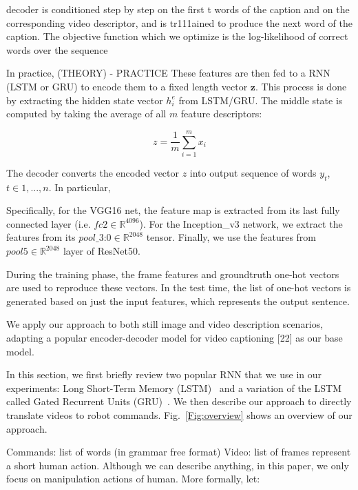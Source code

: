 { 
 decoder is conditioned step by step on the first t words of the caption and on the corresponding video descriptor, and is tr111ained to produce the next word of the caption. The objective function which we optimize is the log-likelihood of correct words over the sequence


In practice, (THEORY) - PRACTICE These features are then fed to a RNN (LSTM or GRU) to encode them to a fixed length vector $\mathbf{z}$. This process is done by extracting the hidden state vector $h_i^e$ from LSTM/GRU. The middle state is computed by taking the average of all $m$ feature descriptors:

\begin{equation}
z = \frac{1}{m}\sum\limits_{i = 1}^m {{x_i}}
\end{equation}

The decoder converts the encoded vector $z$ into output sequence of words $y_t$, $t \in {1, . . . ,n}$. In particular,


Specifically, for the VGG16 net, the feature map is extracted from its last fully connected layer (i.e. $\textit{fc2} \in {\mathbb{R}^{4096}}$). For the Inception\_v3 network, we extract the features from its $\textit{pool\_3:0} \in {\mathbb{R}^{2048}}$ tensor. Finally, we use the features from $\textit{pool5} \in {\mathbb{R}^{2048}}$ layer of ResNet50.

During the training phase, the frame features and  groundtruth one-hot vectors are used to reproduce these vectors. In the test time, the list of one-hot vectors is generated based on just the input features, which represents the output sentence.


We apply our approach to both still image and video description scenarios, adapting a popular encoder-decoder model for video captioning [22] as our base model.



In this section, we first briefly review two popular RNN that we use in our experiments: Long Short-Term Memory (LSTM)~\cite{Hochreiter97_LSTM} and a variation of the LSTM called Gated Recurrent Units (GRU)~\cite{Cho14_GRU}. We then describe our approach to directly translate videos to robot commands. Fig.~\ref{Fig:overview} shows an overview of our approach.



Commands: list of words (in grammar free format)
Video: list of frames represent a short human action. Although we can describe anything, in this paper, we only focus on manipulation actions of human. More formally, let: 

}
